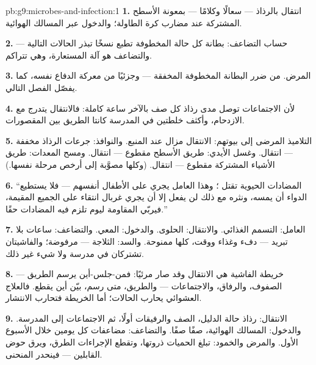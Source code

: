 \begin{solution}{pb:g9:microbes-and-infection:1}
\textbf{1.} انتقال بالرذاذ --- سعالًا وكلامًا --- بمعونة
الأسطح المشتركة عند مضارب كرة الطاولة؛ والدخول عبر
المسالك الهوائية.

\textbf{2.} حساب التضاعف:  بطانة كل حالة المخطوفة
تطبع نسخًا تبذر الحالات التالية --- والتضاعف هو آلة
 المستعارة، وهي تتراكم.

\textbf{3.} المرض. من ضرر  البطانة المخطوفة
المخفقة --- وجزئيًا من معركة الدفاع نفسه، كما يفصّل
الفصل التالي.

\textbf{4.} لأن الاجتماعات توصل مدى رذاذ كل صف بالآخر
ساعة كاملة: فالانتقال يتدرج مع الازدحام، وأكثف خلطتين في
المدرسة كانتا الطريق بين المقصورات.

\textbf{5.} التلاميذ المرضى إلى بيوتهم: الانتقال مزال
عند المنبع. والنوافذ: جرعات الرذاذ مخففة --- انتقال.
وغسل الأيدي: طريق الأسطح مقطوع --- انتقال. ومسح
المعدات: طريق الأشياء المشتركة مقطوع --- انتقال. (وكلها
مصوَّبة إلى أرخص مرحلة نفسها.)

\textbf{6.} ``المضادات الحيوية تقتل ؛ وهذا
العامل  يجري على  الأطفال أنفسهم --- فلا
يستطيع الدواء أن يمسه، ونثره مع ذلك لن يفعل إلا أن يجري
غربال انتقاء على  الجميع المقيمة، فيربّي المقاومة
ليوم تلزم فيه المضادات حقًا.''

\textbf{7.} العامل:  التسمم الغذائي. والانتقال:
الحلوى. والدخول: المعي. والتضاعف: ساعات بلا تبريد ---
دفء  وغذاء ووقت، كلها ممنوحة. والسد: الثلاجة ---
 مرفوضة؛ والفاشيتان تشتركان في مدرسة ولا شيء غير
ذلك.

\textbf{8.} خريطة الفاشية هي الانتقال وقد صار مرئيًا:
فمن-جلس-أين يرسم الطريق --- الصفوف، والرفاق،
والاجتماعات --- والطريق، متى رسم، بيّن أين يقطع.
فالعلاج العشوائي يحارب الحالات؛ أما الخريطة فتحارب
الانتشار.

\textbf{9.} الانتقال: رذاذ حالة الدليل، الصف والرفيقات
أولًا، ثم الاجتماعات إلى المدرسة. والدخول: المسالك
الهوائية، صفًا صفًا. والتضاعف: مضاعفات كل يومين خلال
الأسبوع الأول. والمرض والخمود: تبلغ الحميات ذروتها،
وتقطع الإجراءات الطرق، ويرق حوض القابلين --- فينحدر
المنحنى.


\end{solution}
